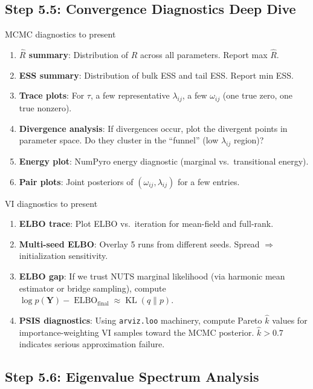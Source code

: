 \documentclass[11pt,a4paper]{article}
\newcommand{\KL}{\operatorname{KL}}
\newcommand{\ELBO}{\operatorname{ELBO}}
\begin{document}
\subsection{Step 5.5: Convergence Diagnostics Deep Dive}

\begin{action}{MCMC diagnostics to present}
\begin{enumerate}
  \item \textbf{$\hat{R}$ summary}: Distribution of $\hat{R}$ across all parameters. Report max $\hat{R}$.
  \item \textbf{ESS summary}: Distribution of bulk ESS and tail ESS. Report min ESS.
  \item \textbf{Trace plots}: For $\tau$, a few representative $\lambda_{ij}$, a few $\omega_{ij}$ (one true zero, one true nonzero).
  \item \textbf{Divergence analysis}: If divergences occur, plot the divergent points in parameter space. Do they cluster in the ``funnel'' (low $\lambda_{ij}$ region)?
  \item \textbf{Energy plot}: NumPyro energy diagnostic (marginal vs.\ transitional energy).
  \item \textbf{Pair plots}: Joint posteriors of $(\omega_{ij}, \lambda_{ij})$ for a few entries.
\end{enumerate}
\end{action}

\begin{action}{VI diagnostics to present}
\begin{enumerate}
  \item \textbf{ELBO trace}: Plot ELBO vs.\ iteration for mean-field and full-rank.
  \item \textbf{Multi-seed ELBO}: Overlay 5 runs from different seeds. Spread $\Rightarrow$ initialization sensitivity.
  \item \textbf{ELBO gap}: If we trust NUTS marginal likelihood (via harmonic mean estimator or bridge sampling), compute $\log p(\bm{Y}) - \ELBO_{\text{final}} \approx \KL(q\|p)$.
  \item \textbf{PSIS diagnostics}: Using \texttt{arviz.loo} machinery, compute Pareto $\hat{k}$ values for importance-weighting VI samples toward the MCMC posterior. $\hat{k} > 0.7$ indicates serious approximation failure.
\end{enumerate}
\end{action}

\subsection{Step 5.6: Eigenvalue Spectrum Analysis}
\end{document}
